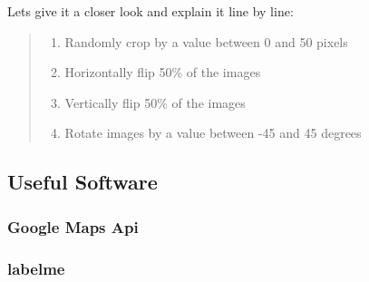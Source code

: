 \documentclass[]{article}
\newenvironment{Shaded}{\begin{snugshade}}{\end{snugshade}}
\newcommand{\CommentTok}[1]{\textcolor[rgb]{0.56,0.35,0.01}{\textit{#1}}}
\newcommand{\DecValTok}[1]{\textcolor[rgb]{0.00,0.00,0.81}{#1}}
\newcommand{\FloatTok}[1]{\textcolor[rgb]{0.00,0.00,0.81}{#1}}
\newcommand{\NormalTok}[1]{#1}
\newcommand{\OperatorTok}[1]{\textcolor[rgb]{0.81,0.36,0.00}{\textbf{#1}}}
\providecommand{\tightlist}{%
  \setlength{\itemsep}{0pt}\setlength{\parskip}{0pt}}
\theoremstyle{definition}
\theoremstyle{definition}
\theoremstyle{definition}
\theoremstyle{remark}
\begin{document}
\hypertarget{lst3}{%
\label{lst3}}%
\begin{Shaded}
\end{Shaded}

\normalsize
\begin{figure}
\end{figure}

Lets give it a closer look and explain it line by line:

\begin{quote}
\begin{enumerate}
\def\labelenumi{(\arabic{enumi})}
\setcounter{enumi}{1}
\tightlist
\item
  Randomly crop by a value between 0 and 50 pixels
\item
  Horizontally flip 50\% of the images
\item
  Vertically flip 50\% of the images
\item
  Rotate images by a value between -45 and 45 degrees
\end{enumerate}
\end{quote}

\hypertarget{useful-software}{%
\subsection{Useful Software}\label{useful-software}}

\hypertarget{google-maps-api}{%
\subsubsection{Google Maps Api}\label{google-maps-api}}

\hypertarget{labelme}{%
\subsubsection{labelme}\label{labelme}}
\end{document}

